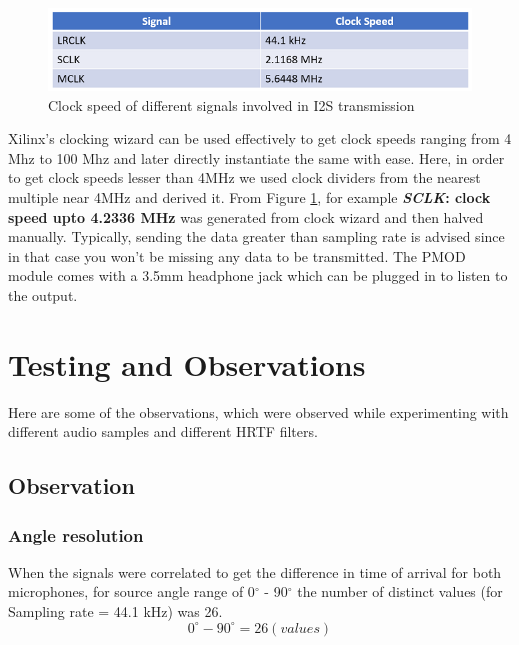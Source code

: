 \documentclass[BTech]{nitkdiss}
\begin{document}
\begin{figure}[h!]
    \centering
    \includegraphics{i2sclkspeeds.png}
    \caption{Clock speed of different signals involved in I2S transmission}
    \label{fig:i2sclk}
\end{figure}
Xilinx's clocking wizard can be used effectively to get clock speeds ranging from 4 Mhz to 100 Mhz and later directly instantiate the same with ease. Here, in order to get clock speeds lesser than 4MHz we used clock dividers from the nearest multiple near 4MHz and derived it. From Figure \ref{fig:i2sclk}, for example \textbf{\textit{SCLK}: clock speed upto 4.2336 MHz} was generated from clock wizard and then halved manually. Typically, sending the data greater than sampling rate is advised since in that case you won't be missing any data to be transmitted. The PMOD module comes with a 3.5mm headphone jack which can be plugged in to listen to the output. 



\chapter{Testing and Observations}
Here are some of the observations, which were observed while experimenting with different audio samples and different HRTF filters.  
\section{Observation}
\subsection{Angle resolution}
When the signals were correlated to get the difference in time of arrival for both microphones, for source angle range of 0$^{\circ}$ - 90$^{\circ}$ the number of distinct values (for Sampling rate = 44.1 kHz) was 26.
\begin{equation}
0^\circ - 90^\circ = 26 (values)
\end{equation}
\end{document}
